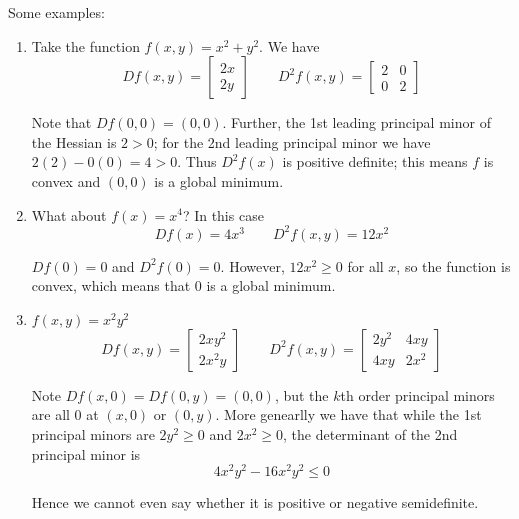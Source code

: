 \documentclass{article}
\begin{document}
Some examples:
\begin{enumerate}
  \item Take the function $f(x, y) = x^2 + y^2$. We have
    \[
      Df(x, y) = \left[\begin{matrix}
      2x \\ 2y
      \end{matrix}\right]
      \quad\quad
      D^2f(x, y) = \left[\begin{matrix}
        2 & 0 \\ 0 & 2
      \end{matrix}\right]
    \]

    Note that $Df(0, 0) = (0, 0)$. Further, the 1st leading principal minor of the Hessian is $2 > 0$; for the 2nd leading principal minor we have $2(2) - 0(0) = 4 > 0$. Thus $D^2f(x)$ is positive definite; this means $f$ is convex and $(0, 0)$ is a global minimum.

  \item What about $f(x) = x^4$? In this case
    \[
      Df(x) = 4x^3
      \quad\quad
      D^2f(x, y) = 12x^2
    \]

    $Df(0) = 0$ and $D^2f(0) = 0$. However, $12x^2 \ge 0$ for all $x$, so the function is convex, which means that $0$ is a global minimum.

  \item $f(x, y) = x^2y^2$
    \[
      Df(x, y) = \left[\begin{matrix}
      2xy^2 \\ 2x^2y
      \end{matrix}\right]
      \quad\quad
      D^2f(x, y) = \left[\begin{matrix}
        2y^2 & 4xy \\ 4xy & 2x^2
      \end{matrix}\right]
    \]

    Note $Df(x, 0) = Df(0, y) = (0, 0)$, but the $k$th order principal minors are all $0$ at $(x, 0)$ or $(0, y)$. More genearlly we have that while the 1st principal minors are $2y^2 \ge 0$ and $2x^2 \ge 0$, the determinant of the 2nd principal minor is
    \[
        4x^2y^2 - 16x^2y^2 \le 0
    \]

    Hence we cannot even say whether it is positive or negative semidefinite.
\end{enumerate}


\clearpage
\printindex

\end{document}
